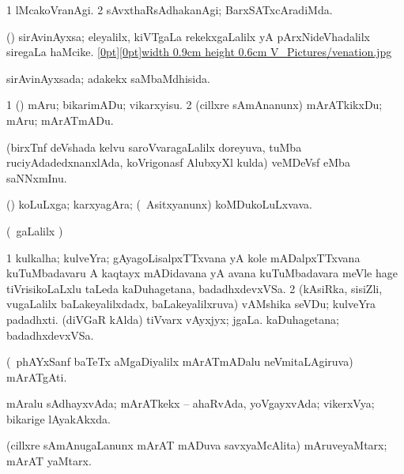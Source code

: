 \bentry
{} 
\gl{\kirxvi}
\expl{}
\bmng
\bnum
\num{1} lMcakoVranAgi. 
\num{2} sAvxthaRsAdhakanAgi; BarxSATxcAradiMda. 
\enum
\emng
\eentry

\bentry
{} 
\gl{\nA}
\bmng
 (\savi) sirAvinAyxsa; eleyalilx, kiVTgaLa rekekxgaLalilx yA pArxNideVhadalilx siregaLa haMcike. \quad \hyperlink{venationfigure}{\raisebox{-0.15cm}[0pt][0pt]{\pdfimage width 0.9cm height 0.6cm {V_Pictures/venation.jpg}}} 
\emng
\eentry

\bentry
{} 
\gl{\gu}
\expl{}
\bmng
 sirAvinAyxsada; adakekx saMbaMdhisida. 
\emng
\eentry

\bentry
{} 
\gl{\sakirx}
\expl{}
\bmng
\bnum
\num{1} (\nAyxshA) mAru; bikarimADu; vikarxyisu. 
\num{2} (cillxre sAmAnanunx) mArATkikxDu; mAru; mArATmADu. 
\enum
\emng
\eentry

\bentry
{} 
\gl{\nA}
\expl{}
\bmng
 (birxTnf deVshada kelvu saroVvaragaLalilx doreyuva, tuMba ruciyAdadedxnanxlAda, koVrigonasf AlubxyXl kulda) veMDeVsf eMba saNNxmInu. 
\emng
\eentry

\bentry
{} 
\gl{\nA}
\expl{}
\bmng
 (\nAyxshA) koLuLxga; karxyagAra; (\kanmu\ Asitxyanunx) koMDukoLuLxvava. 
\emng
\eentry

\bentry
{} 
\gl{\nA}
\expl{}
\bmng
 (\sA\ \saMpa gaLalilx \parx)  
\emng
\eentry

\bentry
{} 
\gl{\nA}
\expl{}
\bmng
\bnum
\num{1} kulkalha; kulveYra; gAyagoLisalpxTTxvana yA kole mADalpxTTxvana kuTuMbadavaru A kaqtayx mADidavana yA avana kuTuMbadavara meVle hage tiVrisikoLaLxlu taLeda kaDuhagetana, badadhxdevxVSa. 
\num{2} (kAsiRka, sisiZli, \mo vugaLalilx baLakeyalilxdadx, baLakeyalilxruva) vAMshika seVDu; kulveYra padadhxti. 
 (diVGaR kAlda) 
\banum
{} tiVvarx vAyxjyx; jgaLa. 
 kaDuhagetana; badadhxdevxVSa. 
\eanum
\numie
\enum
\emng
\eentry

\bentry 
{} 
\gl{\nA}
\expl{\F\ }
\bmng
 (\kanmu\ phAYxSanf baTeTx aMgaDiyalilx mArATmADalu neVmitaLAgiruva) mArATgAti. 
\emng
\eentry

\bentry
{} 
\gl{\gu}
\expl{}
\bmng
 mAralu sAdhayxvAda; mArATkekx -- ahaRvAda, yoVgayxvAda; vikerxVya; bikarige lAyakAkxda. 
\emng
\eentry

\bentry
{} 
\gl{\nA}
\expl{}
\bmng
 (cillxre sAmAnugaLanunx mArAT mADuva savxyaMcAlita) mAruveyaMtarx; mArAT yaMtarx. 
\emng
\eentry

